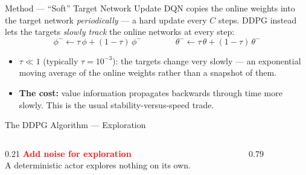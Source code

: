 \begin{frame}{Method --- ``Soft'' Target Network Update}
\vspace{0.5em}
DQN copies the online weights into the target network \emph{periodically} --- a hard update every $C$ steps. DDPG instead lets the targets \emph{slowly track} the online networks at every step:
\[
\phi^{-} \leftarrow \tau\, \phi + (1-\tau)\, \phi^{-}
\qquad\qquad
\theta^{-} \leftarrow \tau\, \theta + (1-\tau)\, \theta^{-}
\]
\vspace{0.2em}
\begin{itemize}
    \item $\tau \ll 1$ (typically $\tau = 10^{-3}$): the targets change very slowly --- an exponential moving average of the online weights rather than a snapshot of them.
    \pause
    \item \textbf{The cost:} value information propagates backwards through time more slowly. This is the usual stability-versus-speed trade.
\end{itemize}
\end{frame}

\begin{frame}{The DDPG Algorithm --- Exploration}
\begin{columns}[T]
\begin{column}{0.21\textwidth}
\vspace{5.7em}
\footnotesize
\textbf{\textcolor{red}{Add noise for exploration}}\\[0.4em]
{\scriptsize A deterministic actor explores nothing on its own.}
\end{column}
\begin{column}{0.79\textwidth}
\end{column}
\end{columns}
\end{frame}

